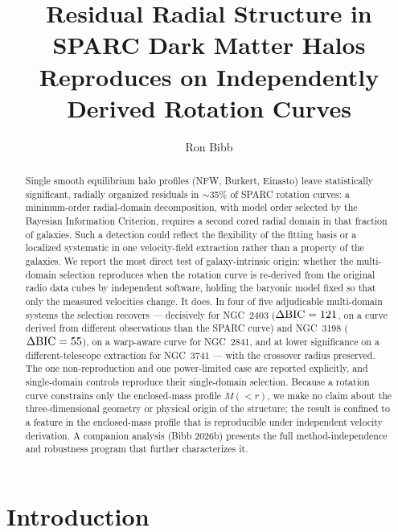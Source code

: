 \documentclass[linenumbers,twocolumn]{aastex701}
\newcommand{\dbic}{\Delta{\rm BIC}}
\begin{document}
\title{Residual Radial Structure in SPARC Dark Matter Halos Reproduces on
Independently Derived Rotation Curves}

\author[0009-0004-1153-2464]{Ron Bibb}

\begin{abstract}
Single smooth equilibrium halo profiles (NFW, Burkert, Einasto) leave
statistically significant, radially organized residuals in $\sim$35\% of SPARC
rotation curves: a minimum-order radial-domain decomposition, with model
order selected by the Bayesian Information Criterion, requires a second cored
radial domain in that fraction of galaxies. Such a detection could reflect the
flexibility of the fitting basis or a localized systematic in one velocity-field
extraction rather than a property of the galaxies. We report the most direct test of
galaxy-intrinsic origin: whether the multi-domain selection reproduces when the
rotation curve is re-derived from the original radio data cubes by independent
software, holding the baryonic model fixed so that only the measured velocities
change. It does. In four of five adjudicable multi-domain systems the selection
recovers --- decisively for NGC~2403 ($\dbic = 121$, on a curve derived from
different observations than the SPARC curve) and NGC~3198 ($\dbic = 55$), on a
warp-aware curve for NGC~2841, and at lower significance on a
different-telescope extraction for NGC~3741 --- with the crossover radius
preserved. The one non-reproduction and one power-limited case are reported
explicitly, and single-domain controls reproduce their single-domain selection.
Because a rotation curve constrains only the enclosed-mass profile $M({<}r)$, we make
no claim about the three-dimensional geometry or physical origin of the structure; the
result is confined to a feature in the enclosed-mass profile that is reproducible under
independent velocity derivation. A companion analysis (Bibb 2026b) presents the full method-independence and
robustness program that further characterizes it.
\end{abstract}


\section{Introduction} \label{sec:intro}
\end{document}
